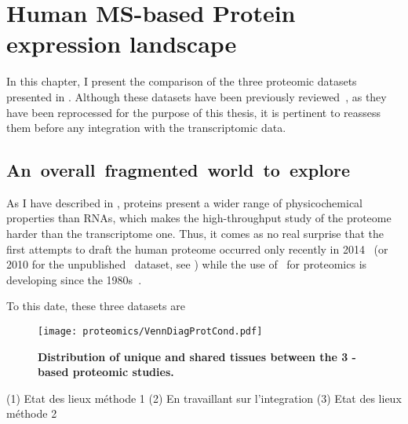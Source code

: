 \chapter{Human MS-based Protein expression landscape}\label{ch:proteomics}


In this chapter, I present the comparison of
the three proteomic datasets presented in .
Although these datasets have been previously
reviewed~,
as they have been reprocessed for the purpose of this thesis,
it is pertinent to reassess them before any integration with the transcriptomic data.







\section{An~overall~fragmented~world~to~explore}

As I have described in ,
proteins present a wider range of physicochemical properties than \glspl{RNA},
which makes the high-throughput study of the proteome
harder than the transcriptome one.
Thus, it comes as no real surprise that
the first attempts to draft the human proteome occurred only recently
in 2014~
(or 2010 for the unpublished \cutler\ dataset, see )
while the use of \ms\ for proteomics is developing since the 1980s~.

To this date,
these three datasets are 

\begin{figure}[htpb]
    \texttt{[image: proteomics/VennDiagProtCond.pdf]}\centering
    \caption[Distribution of unique shared tissues between
    the 3 MS-based proteomic studies]{\label{fig:VennDiagProt3}\textbf{Distribution
    of unique and shared tissues between the 3 \ms{}-based proteomic studies.}}
\end{figure}








(1) Etat des lieux méthode 1
(2) En travaillant sur l'integration 
(3) Etat des lieux méthode 2

